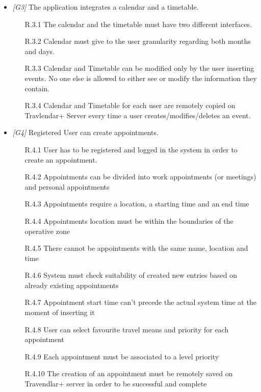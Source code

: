 \begin{itemize}
	\item \textit{[G3]} The application integrates a calendar and a timetable.
		\begin{itemize}
			\item [R.3.1] The calendar and the timetable must have two different interfaces.
			\item [R.3.2] Calendar must give to the user granularity regarding both months and days.
			\item [R.3.3] Calendar and Timetable can be modified only by the user inserting events. No one else is allowed to either see or modify the information they contain.
			\item [R.3.4] Calendar and Timetable for each user are remotely copied on Travlendar+ Server every time a user creates/modifies/deletes an event.
		\end{itemize}
                  
	
	\item \textit{[G4]} Registered User can create appointments.
		\begin{itemize}
			\item [R.4.1] User has to be registered and logged in the system in order to create an
appointment.
			\item [R.4.2] Appointments can be divided into work appointments (or meetings) and personal appointments
			\item [R.4.3] Appointments require a location, a starting time and an end time
			\item [R.4.4] Appointments location must be within the boundaries of the operative zone
			\item [R.4.5] There cannot be appointments with the same name, location and time
			\item [R.4.6] System must check suitability of created new entries based on already existing appointments
			\item [R.4.7] Appointment start time can't precede the actual system time at the moment of inserting it                                 							
			\item [R.4.8] User can select favourite travel means and priority for each appointment
			\item [R.4.9] Each appointment must be associated to a level priority
			\item [R.4.10] The creation of an appointment must be remotely saved on Travendlar+ server in order to be successful and complete
		\end{itemize}



\end{itemize}
